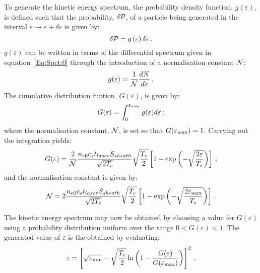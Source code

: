 To generate the kinetic energy spectrum, the probability density
function, $g(\varepsilon)$, is defined such that the probability,
$\delta \cal{P}$, of a particle being generated in the interval
$\varepsilon \rightarrow \varepsilon + \delta \varepsilon$ is given
by:
\begin{equation}
   \delta {\cal P} = g \left( \varepsilon \right) \delta \varepsilon \, .
\end{equation}
$g(\varepsilon)$ can be written in terms of the differential spectrum
given in equation~\ref{Eq:Spct:0} through the introduction of a
normalisation constant $\cal{N}$:
\begin{equation}
  g(\varepsilon) = \frac{1}{\cal{N}} \frac{dN}{d\varepsilon} \, .
\end{equation}
The cumulative distribution funtion, $G(\varepsilon)$, is given by:
\begin{equation}
  G(\varepsilon) = \int_0^{\varepsilon_{\rm max}} g(\varepsilon)
                                               d\varepsilon \,;
\end{equation}
where the normalisation constant, $\cal{N}$, is set so that
$G(\varepsilon_{\rm max}) = 1$.
Carrying out the integration yields:
\begin{equation}
  G(\varepsilon) = \frac{2}{\cal{N}}
                   \frac{n_{e0} c_{s} t_{laser} S_{sheath}} {\sqrt{2T_{e}}}
                   \sqrt{\frac{T_{e}}{2}}
                   \left[
                     1 - \exp\left(
                                   -\sqrt{\frac{2\varepsilon}{T_{e}}}
                             \right)
                   \right] \, ;
\end{equation}
and the normalisation constant is given by:
\begin{equation}
  {\cal N} = 2
             \frac{n_{e0} c_{s} t_{laser} S_{sheath}} {\sqrt{2T_{e}}}
             \sqrt{\frac{T_{e}}{2}}
             \left[
               1 - \exp\left(
                              -\sqrt{\frac{2\varepsilon_{\rm max}}{T_{e}}}
                       \right)
             \right] \, .
\end{equation}

The kinetic energy spectrum may now be obtained by choosing a value
for $G(\varepsilon)$ using a probability distribution uniform over the
range $0 < G(\varepsilon) < 1$.
The generated value of $\varepsilon$ is the obtained by evaluating:
\begin{equation}
  \varepsilon = \left[
                      \sqrt{\varepsilon_{\rm min}} -
                      \sqrt{\frac{T_e}{2}} \ln \left(
                     1 - \frac{G(\varepsilon)}{G(\varepsilon_{\rm max})}
                                               \right)
                \right]^2 \, .
\end{equation}

